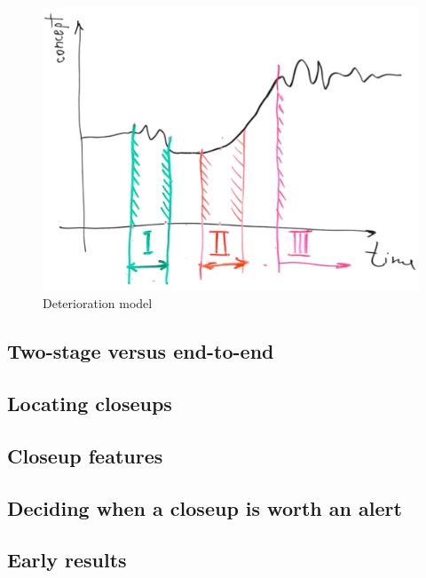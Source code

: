 \begin{figure}[htbp]
\centering
\includegraphics{deterioration-model.pdf}
\caption{Deterioration model}
\end{figure}

\subsection{Two-stage versus
end-to-end}\label{two-stage-versus-end-to-end}

\subsection{Locating closeups}\label{locating-closeups}

\subsection{Closeup features}\label{closeup-features}

\subsection{Deciding when a closeup is worth an
alert}\label{deciding-when-a-closeup-is-worth-an-alert}

\subsection{Early results}\label{early-results}
